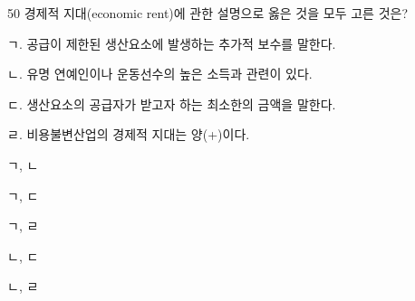 \begin{question}{50}
경제적 지대(economic rent)에 관한 설명으로 옳은 것을 모두 고른 것은?
\begin{framedtext}
ㄱ. 공급이 제한된 생산요소에 발생하는 추가적 보수를 말한다. \par
ㄴ. 유명 연예인이나 운동선수의 높은 소득과 관련이 있다. \par
ㄷ. 생산요소의 공급자가 받고자 하는 최소한의 금액을 말한다. \par
ㄹ. 비용불변산업의 경제적 지대는 양(+)이다.
\end{framedtext}
\begin{choices}
  \item ㄱ, ㄴ
  \item ㄱ, ㄷ
  \item ㄱ, ㄹ
  \item ㄴ, ㄷ
  \item ㄴ, ㄹ
\end{choices}
\end{question}

